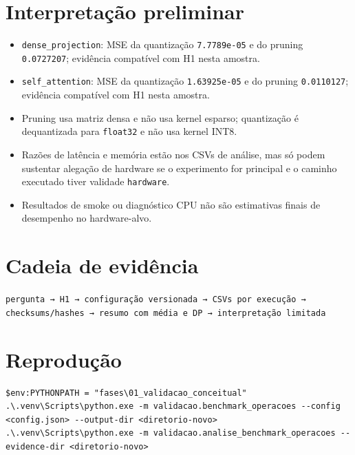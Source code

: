 \section{Interpretação preliminar}


\begin{itemize}
\item \texttt{dense\_\allowbreak{}projection}: MSE da quantização \texttt{7.\allowbreak{}7789e-05} e do pruning \texttt{0.\allowbreak{}0727207}; evidência compatível com H1 nesta amostra.
\item \texttt{self\_\allowbreak{}attention}: MSE da quantização \texttt{1.\allowbreak{}63925e-05} e do pruning \texttt{0.\allowbreak{}0110127}; evidência compatível com H1 nesta amostra.
\item Pruning usa matriz densa e não usa kernel esparso; quantização é dequantizada para \texttt{float32} e não usa kernel INT8.
\item Razões de latência e memória estão nos CSVs de análise, mas só podem sustentar alegação de hardware se o experimento for principal e o caminho executado tiver validade \texttt{hardware}.
\item Resultados de smoke ou diagnóstico CPU não são estimativas finais de desempenho no hardware-alvo.
\end{itemize}


\section{Cadeia de evidência}



\texttt{pergunta → H1 → configuração versionada → CSVs por execução → checksums/\allowbreak{}hashes → resumo com média e DP → interpretação limitada}



\section{Reprodução}



\begin{Verbatim}[fontsize=\small,breaklines=true,label=powershell]
$env:PYTHONPATH = "fases\01_validacao_conceitual"
.\.venv\Scripts\python.exe -m validacao.benchmark_operacoes --config <config.json> --output-dir <diretorio-novo>
.\.venv\Scripts\python.exe -m validacao.analise_benchmark_operacoes --evidence-dir <diretorio-novo>
\end{Verbatim}
